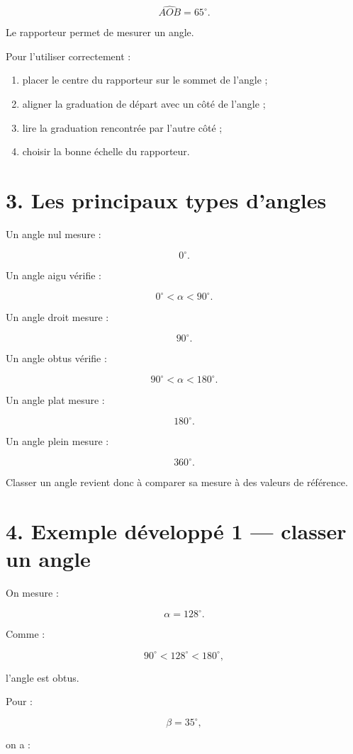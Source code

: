 \[
\widehat{AOB}=65^\circ.
\]

Le rapporteur permet de mesurer un angle.

Pour l’utiliser correctement :

\begin{enumerate}
\item placer le centre du rapporteur sur le sommet de l’angle ;
\item aligner la graduation de départ avec un côté de l’angle ;
\item lire la graduation rencontrée par l’autre côté ;
\item choisir la bonne échelle du rapporteur.
\end{enumerate}

\section{3. Les principaux types d’angles}

Un angle nul mesure :

\[
0^\circ.
\]

Un angle aigu vérifie :

\[
0^\circ<\alpha<90^\circ.
\]

Un angle droit mesure :

\[
90^\circ.
\]

Un angle obtus vérifie :

\[
90^\circ<\alpha<180^\circ.
\]

Un angle plat mesure :

\[
180^\circ.
\]

Un angle plein mesure :

\[
360^\circ.
\]

Classer un angle revient donc à comparer sa mesure à des valeurs de référence.

\section{4. Exemple développé 1 — classer un angle}

On mesure :

\[
\alpha=128^\circ.
\]

Comme :

\[
90^\circ<128^\circ<180^\circ,
\]

l’angle est obtus.

Pour :

\[
\beta=35^\circ,
\]

on a :

